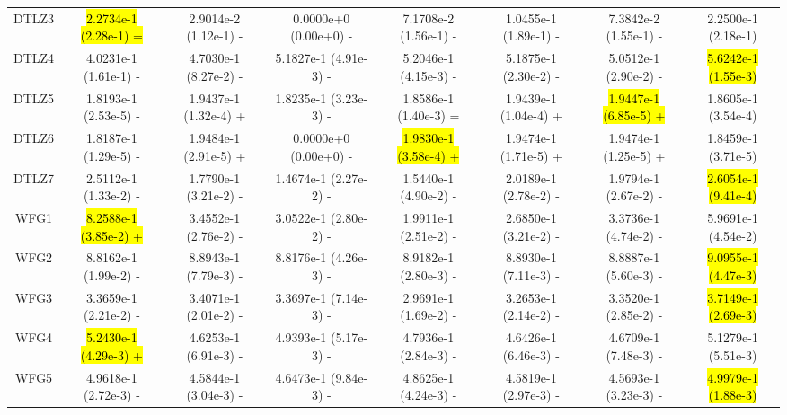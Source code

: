 \documentclass[journal]{IEEEtran}
\begin{document}
\begin{table}[tbp]
{\begin{tabular}{cccccccc}
            DTLZ3   & \hl{2.2734e-1 (2.28e-1) =} & 2.9014e-2 (1.12e-1) -      & 0.0000e+0 (0.00e+0) -      & 7.1708e-2 (1.56e-1) -      & 1.0455e-1 (1.89e-1) -      & 7.3842e-2 (1.55e-1) -      & 2.2500e-1 (2.18e-1)      \\
            DTLZ4   & 4.0231e-1 (1.61e-1) -      & 4.7030e-1 (8.27e-2) -      & 5.1827e-1 (4.91e-3) -      & 5.2046e-1 (4.15e-3) -      & 5.1875e-1 (2.30e-2) -      & 5.0512e-1 (2.90e-2) -      & \hl{5.6242e-1 (1.55e-3)} \\
            DTLZ5   & 1.8193e-1 (2.53e-5) -      & 1.9437e-1 (1.32e-4) +      & 1.8235e-1 (3.23e-3) -      & 1.8586e-1 (1.40e-3) =      & 1.9439e-1 (1.04e-4) +      & \hl{1.9447e-1 (6.85e-5) +} & 1.8605e-1 (3.54e-4)      \\
            DTLZ6   & 1.8187e-1 (1.29e-5) -      & 1.9484e-1 (2.91e-5) +      & 0.0000e+0 (0.00e+0) -      & \hl{1.9830e-1 (3.58e-4) +} & 1.9474e-1 (1.71e-5) +      & 1.9474e-1 (1.25e-5) +      & 1.8459e-1 (3.71e-5)      \\
            DTLZ7   & 2.5112e-1 (1.33e-2) -      & 1.7790e-1 (3.21e-2) -      & 1.4674e-1 (2.27e-2) -      & 1.5440e-1 (4.90e-2) -      & 2.0189e-1 (2.78e-2) -      & 1.9794e-1 (2.67e-2) -      & \hl{2.6054e-1 (9.41e-4)} \\
            \hline
            WFG1    & \hl{8.2588e-1 (3.85e-2) +} & 3.4552e-1 (2.76e-2) -      & 3.0522e-1 (2.80e-2) -      & 1.9911e-1 (2.51e-2) -      & 2.6850e-1 (3.21e-2) -      & 3.3736e-1 (4.74e-2) -      & 5.9691e-1 (4.54e-2)      \\
            WFG2    & 8.8162e-1 (1.99e-2) -      & 8.8943e-1 (7.79e-3) -      & 8.8176e-1 (4.26e-3) -      & 8.9182e-1 (2.80e-3) -      & 8.8930e-1 (7.11e-3) -      & 8.8887e-1 (5.60e-3) -      & \hl{9.0955e-1 (4.47e-3)} \\
            WFG3    & 3.3659e-1 (2.21e-2) -      & 3.4071e-1 (2.01e-2) -      & 3.3697e-1 (7.14e-3) -      & 2.9691e-1 (1.69e-2) -      & 3.2653e-1 (2.14e-2) -      & 3.3520e-1 (2.85e-2) -      & \hl{3.7149e-1 (2.69e-3)} \\
            WFG4    & \hl{5.2430e-1 (4.29e-3) +} & 4.6253e-1 (6.91e-3) -      & 4.9393e-1 (5.17e-3) -      & 4.7936e-1 (2.84e-3) -      & 4.6426e-1 (6.46e-3) -      & 4.6709e-1 (7.48e-3) -      & 5.1279e-1 (5.51e-3)      \\
            WFG5    & 4.9618e-1 (2.72e-3) -      & 4.5844e-1 (3.04e-3) -      & 4.6473e-1 (9.84e-3) -      & 4.8625e-1 (4.24e-3) -      & 4.5819e-1 (2.97e-3) -      & 4.5693e-1 (3.23e-3) -      & \hl{4.9979e-1 (1.88e-3)} \\

\end{tabular}}
\end{table}
\end{document}
